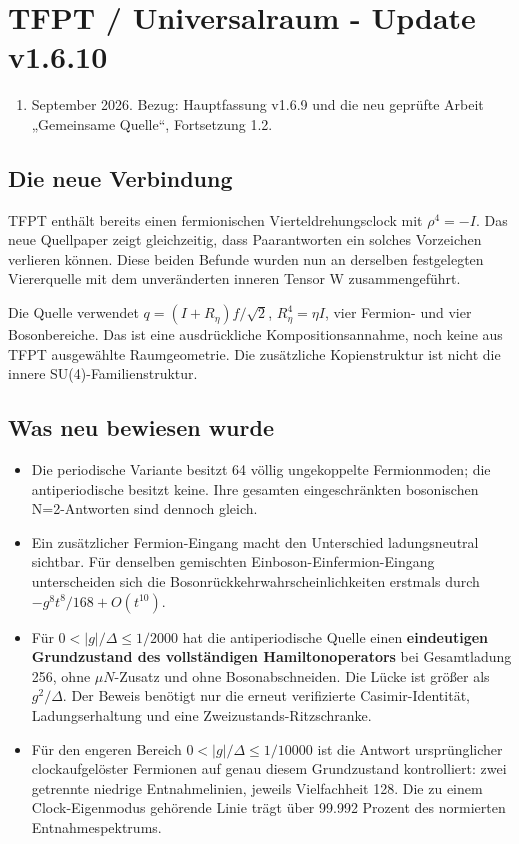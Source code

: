 \documentclass[
  ngerman,
  10pt,
  a4paper,
]{article}
\author{}
\date{}
\providecommand{\tightlist}{%
  \setlength{\itemsep}{0pt}\setlength{\parskip}{0pt}}
\begin{document}
\section{TFPT / Universalraum - Update
v1.6.10}\label{tfpt-universalraum---update-v1.6.10}

\begin{enumerate}
\def\labelenumi{\arabic{enumi}.}
\setcounter{enumi}{14}
\tightlist
\item
  September 2026. Bezug: Hauptfassung v1.6.9 und die neu geprüfte Arbeit
  „Gemeinsame Quelle``, Fortsetzung 1.2.
\end{enumerate}

\subsection{Die neue Verbindung}\label{die-neue-verbindung}

TFPT enthält bereits einen fermionischen Vierteldrehungsclock mit
\(\rho^4=-I\). Das neue Quellpaper zeigt gleichzeitig, dass
Paarantworten ein solches Vorzeichen verlieren können. Diese beiden
Befunde wurden nun an derselben festgelegten Viererquelle mit dem
unveränderten inneren Tensor W zusammengeführt.

Die Quelle verwendet \(q=(I+R_\eta)f/\sqrt2\), \(R_\eta^4=\eta I\), vier
Fermion- und vier Bosonbereiche. Das ist eine ausdrückliche
Kompositionsannahme, noch keine aus TFPT ausgewählte Raumgeometrie. Die
zusätzliche Kopienstruktur ist nicht die innere SU(4)-Familienstruktur.

\subsection{Was neu bewiesen wurde}\label{was-neu-bewiesen-wurde}

\begin{itemize}
\tightlist
\item
  Die periodische Variante besitzt 64 völlig ungekoppelte Fermionmoden;
  die antiperiodische besitzt keine. Ihre gesamten eingeschränkten
  bosonischen N=2-Antworten sind dennoch gleich.
\item
  Ein zusätzlicher Fermion-Eingang macht den Unterschied ladungsneutral
  sichtbar. Für denselben gemischten Einboson-Einfermion-Eingang
  unterscheiden sich die Bosonrückkehrwahrscheinlichkeiten erstmals
  durch \(-g^8t^8/168+O(t^{10})\).
\item
  Für \(0<|g|/\Delta\le1/2000\) hat die antiperiodische Quelle einen
  \textbf{eindeutigen Grundzustand des vollständigen Hamiltonoperators}
  bei Gesamtladung 256, ohne \(\mu N\)-Zusatz und ohne Bosonabschneiden.
  Die Lücke ist größer als \(g^2/\Delta\). Der Beweis benötigt nur die
  erneut verifizierte Casimir-Identität, Ladungserhaltung und eine
  Zweizustands-Ritzschranke.
\item
  Für den engeren Bereich \(0<|g|/\Delta\le1/10000\) ist die Antwort
  ursprünglicher clockaufgelöster Fermionen auf genau diesem
  Grundzustand kontrolliert: zwei getrennte niedrige Entnahmelinien,
  jeweils Vielfachheit 128. Die zu einem Clock-Eigenmodus gehörende
  Linie trägt über 99.992 Prozent des normierten Entnahmespektrums.
\end{itemize}
\end{document}
